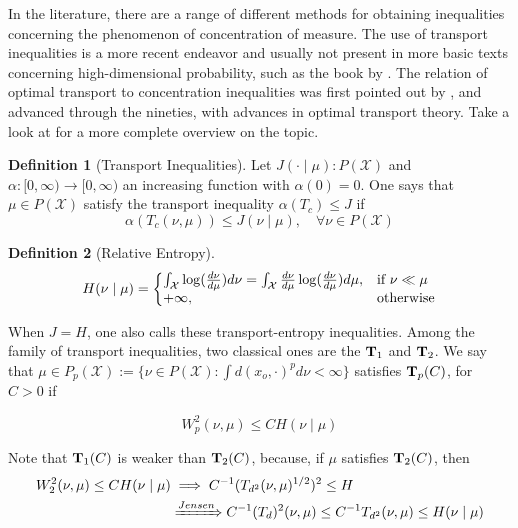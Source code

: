 \documentclass[10pt]{article}
\theoremstyle{definition}
\newtheorem{definition}{Definition}[section]
\begin{document}
In the literature, there are a range of different methods for obtaining inequalities
concerning the phenomenon of concentration of measure. The use of transport inequalities
is a more recent endeavor and usually not present in more basic texts concerning
high-dimensional probability, such as the book by \citet{vershynin2018high}.
The relation of optimal transport to concentration inequalities was first pointed out by \citet{marton1986simple},  and advanced through the nineties, with advances in optimal
transport theory. Take a look at \citet{gozlan2010transport} for a more complete overview
on the topic.

\begin{definition}[Transport Inequalities]
	Let $J(\cdot \mid \mu): P(\mathcal X)$ and
	$\alpha:[0,\infty) \rightarrow [0,\infty)$ an increasing function with $\alpha(0)=0$.
	One says that $\mu \in P(\mathcal X)$ satisfy the transport inequality
	$\alpha(T_c) \leq J$ if
	$$
	\alpha(T_c(\nu,\mu)) \leq J(\nu \mid \mu) , \quad \forall \nu \in P(\mathcal X)
	$$
\end{definition}
\begin{definition}[Relative Entropy]
$$
	H(\nu \mid \mu) =
	\left\{
	  \begin{array}{@{}ll@{}}
	    \int_\mathcal X \log(\frac{d\nu}{d\mu})d\nu =
	    \int_\mathcal X \frac{d\nu}{d\mu}\log(\frac{d\nu}{d\mu})d\mu
	    , & \text{if}\ \nu \ll\mu \\
	    +\infty, & \text{otherwise}
	  \end{array}\right.
$$
\end{definition}

When $J  = H$, one also calls these transport-entropy inequalities. Among the family
of transport inequalities, two classical ones are the $\textbf T_1$ and $\textbf T_2$. We
say that $\mu \in P_p(\mathcal X)
:= \{ \nu \in P(\mathcal X): \int d(x_o, \cdot)^p d\nu < \infty\}$ satisfies
$\textbf T_p(C)$, for $C > 0$ if

\begin{equation}
	W_p^2(\nu,\mu) \leq C H(\nu \mid \mu)
\end{equation}

Note that $\textbf T_1(C)$ is weaker than $\textbf T_2(C)$, because, if $\mu$ satisfies
$\textbf T_2(C)$, then
\begin{align*}
W_2^2(\nu,\mu) \leq C H(\nu \mid \mu) &\implies C^{-1}(T_{d^2}(\nu,\mu)^{1/2})^2 \leq H
\\
&\xRightarrow{Jensen}
C^{-1}(T_{d})^2(\nu,\mu) \leq 
C^{-1}T_{d^2}(\nu,\mu) \leq H(\nu \mid \mu)
\end{align*}
\end{document}
